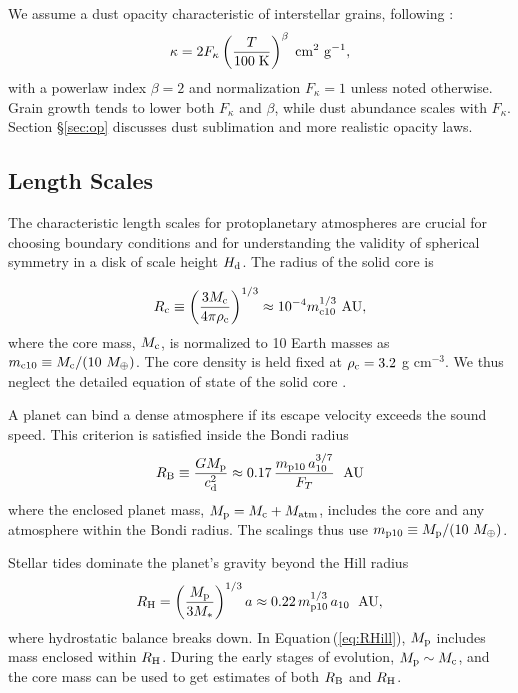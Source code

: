 \documentclass[apj, numberedappendix]{emulateapj}
\newcommand{\AU}{\; {\rm AU}}
\newcommand{\Eq}[1]{Equation\,(\ref{#1})}
\newcommand{\RB}{R_{\rm B}}
\newcommand{\RH}{R_{\rm H}}
\newcommand{\co}{_{\rm c}}
\newcommand{\pla}{_{\rm p}}
\newcommand{\di}{_{\rm d}}
\newcommand{\mcn}[1] { m_{ \rm c #1} }
\newcommand{\mpn}[1] { m_{ \rm p #1} }
\newcommand{\aun}[1]{ a_{#1} }
\begin{document}
We assume a dust opacity characteristic of interstellar grains, following \citet{bell94}:
\begin{equation}
\label{eq:opacitylaw}
\kappa= 2 F_\kappa  \left(\frac{T}{100\; \rm{K}}\right)^{\beta} \; \mathrm{cm^2 ~ g^{-1}},
\end{equation}
with a powerlaw index $\beta = 2$ and normalization $F_\kappa = 1$ unless noted otherwise. Grain growth tends to lower both $F_\kappa$ and $\beta$, while dust abundance scales with $F_\kappa$.   Section \S\ref{sec:op} discusses dust sublimation and more realistic opacity laws.


\subsection{Length Scales}
\label{sec:scales}

The characteristic length scales for protoplanetary atmospheres are crucial for choosing boundary conditions and for understanding the validity of  spherical symmetry in a disk of scale height $H\di$.  The radius of the solid core is

\begin{equation}
\label{eq:rc}
R\co \equiv \left(\frac{3 M\co}{4 \pi \rho\co}\right)^{1/3} \approx 10^{-4} \mcn{10}^{1/3} ~\text{AU},
\end{equation}
where the core mass, $M\co$, is normalized to 10 Earth masses as $\mcn{10} \equiv M\co/(10~M_\oplus)$. The core density is held fixed at $\rho\co=3.2$ g cm$^{-3}$.  We thus neglect  the detailed equation of state of the solid core \citep{fortney07}.

A planet can bind a dense atmosphere if its escape velocity exceeds the sound speed.  This criterion is satisfied inside the Bondi radius
\begin{equation}
\label{eq:RB}
\RB \equiv \frac{G M\pla}{c\di^2} \approx 0.17 \, {\mpn{10}  \, \aun{10}^{3/7} \over F_T} ~\AU
\end{equation}
where the enclosed planet mass, $M\pla = M\co + M_\mathrm{atm}$, includes the core and any atmosphere within the Bondi radius.  The scalings thus use $\mpn{10} \equiv M\pla /(10~M_\oplus)$.   

Stellar tides dominate the planet's gravity beyond the Hill radius
\begin{equation}
\label{eq:RHill}
R_{\rm H} = \left(M\pla \over 3 M_\ast \right)^{1/3}a \approx 0.22 \, {\mpn{10}^{1/3} \, \aun{10} }~\AU ,
\end{equation}
where hydrostatic balance breaks down.  In \Eq{eq:RHill}, $M\pla$ includes mass enclosed within $\RH$.  During the early stages of evolution, $M\pla \sim M\co$, and the core mass can be used to get estimates of both $\RB$ and $\RH$. 
\end{document}
